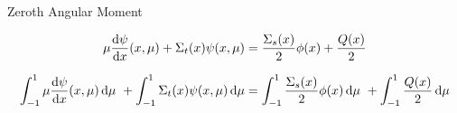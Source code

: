 
\begin{frame}{Zeroth Angular Moment}



    \onslide<+->
    \begin{equation*}
            \mu \frac{\mathop{}\!\mathrm{d} \psi}{\mathop{}\!\mathrm{d} x}(x, \mu) + 
            \Sigma_t(x) \psi(x,\mu) = 
            \frac{\Sigma_s(x)}{2} \phi(x) + 
            \frac{Q(x)}{2} 
        \end{equation*}

    \small
    \onslide<+->
    \begin{equation*}
        \int_{-1}^{1} \mu \frac{\mathop{}\!\mathrm{d} \psi}{\mathop{}\!\mathrm{d} x}(x, \mu) \mathop{}\!\mathrm{d} \mu \ + 
        \int_{-1}^{1} \Sigma_t(x) \psi(x,\mu) \mathop{}\!\mathrm{d} \mu = 
        \int_{-1}^{1} \frac{\Sigma_s(x)}{2} \phi(x) \mathop{}\!\mathrm{d} \mu \ + 
        \int_{-1}^{1} \frac{Q(x)}{2} \mathop{}\!\mathrm{d} \mu 
    \end{equation*}






\end{frame}
